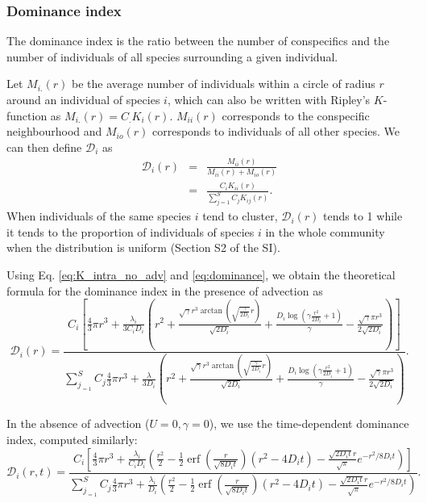 \documentclass[english]{article}
\DeclareMathOperator\erf{erf}
\begin{document}
\subsubsection*{Dominance index}

The dominance index \citep[defined in Table S1 in the Supporting Information of][]{wiegand_how_2007}
is the ratio between the number of conspecifics and the number of
individuals of all species surrounding a given individual.

 Let $M_{i.}(r)$ be the average number of individuals within a circle
of radius $r$ around an individual of species $i$, which can also
be written with Ripley's $K$-function as $M_{i.}(r)=C_{.}K_{i}(r)$.
$M_{ii}(r)$ corresponds to the conspecific neighbourhood and $M_{io}(r)$
corresponds to individuals of all other species. We can then define
$\mathcal{D}_{i}$ as
\begin{equation}
\begin{array}{ccc}
\mathcal{D}_{i}(r) & = & \frac{M_{ii}(r)}{M_{ii}(r)+M_{io}(r)}\\
 & = & \frac{C_{i}K_{ii}(r)}{\sum_{j=1}^{S}C_{j}K_{ij}(r)}.
\end{array}\label{eq:dominance}
\end{equation}
When individuals of the same species $i$ tend to cluster, $\mathcal{D}_{i}(r)$
tends to 1 while it tends to the proportion of individuals of species
$i$ in the whole community when the distribution is uniform (Section
S2 of the SI).

Using Eq. \ref{eq:K_intra_no_adv} and \ref{eq:dominance}, we obtain
the theoretical formula for the dominance index in the presence of
advection as
\begin{equation}
\mathcal{D}_{i}(r)=\frac{C_{i}\left[\frac{4}{3}\pi r^{3}+\frac{\lambda_i}{3C_{i}D_i}\left(r^{2}+\frac{\sqrt{\gamma}r^{3}\arctan(\sqrt{\frac{\gamma}{2D_i}}r)}{\sqrt{2D_i}}+\frac{D_i\log\left(\gamma\frac{r^{2}}{2D_i}+1\right)}{\gamma}-\frac{\sqrt{\gamma}\pi r^{3}}{2\sqrt{2D_i}}\right)\right]}{\sum_{j_{=1}}^{S}C_{j}\frac{4}{3}\pi r^{3}+\frac{\lambda}{3D_i}\left(r^{2}+\frac{\sqrt{\gamma}r^{3}\arctan(\sqrt{\frac{\gamma}{2D_i}}r)}{\sqrt{2D_i}}+\frac{D_i\log\left(\gamma\frac{r^{2}}{2D_i}+1\right)}{\gamma}-\frac{\sqrt{\gamma}\pi r^{3}}{2\sqrt{2D_i}}\right)}.\label{eq:dom_adv}
\end{equation}

In the absence of advection ($U=0,\gamma=0$), we use the time-dependent
dominance index, computed similarly:
\begin{equation}
\mathcal{D}_{i}(r,t)=\frac{C_{i}\left[\frac{4}{3}\pi r^{3}+\frac{\lambda_i}{C_{i}D_i}\left(\frac{r^{2}}{2}-\frac{1}{2}\erf(\frac{r}{\sqrt{8D_i t}})(r^{2}-4D_i t)-\frac{\sqrt{2D_it}r}{\sqrt{\pi}}e^{-r^{2}/8D_i t}\right)\right]}{\sum_{j_{=1}}^{S}C_{j}\frac{4}{3}\pi r^{3}+\frac{\lambda_i}{D_i}\left(\frac{r^{2}}{2}-\frac{1}{2}\erf(\frac{r}{\sqrt{8D_i t}})(r^{2}-4D_i t)-\frac{\sqrt{2D_i t}r}{\sqrt{\pi}}e^{-r^{2}/8D_i t}\right)}.\label{eq:dom_noadv}
\end{equation}
\end{document}
